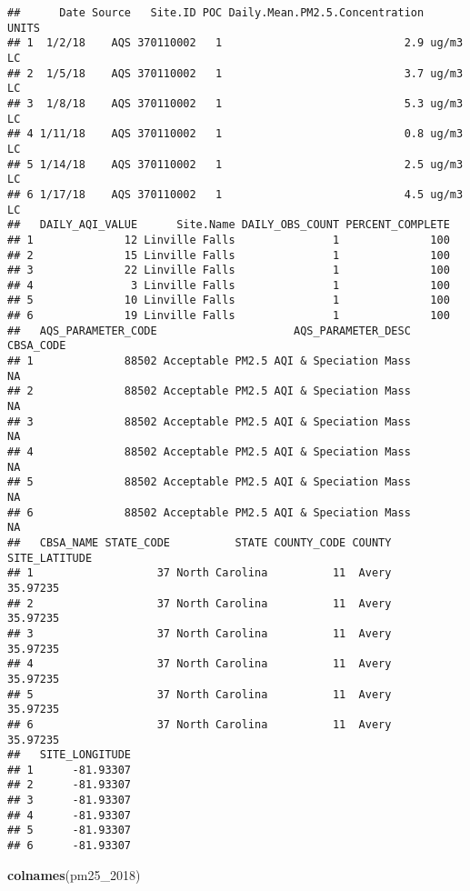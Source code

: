 \documentclass[]{article}
\newenvironment{Shaded}{\begin{snugshade}}{\end{snugshade}}
\newcommand{\KeywordTok}[1]{\textcolor[rgb]{0.13,0.29,0.53}{\textbf{#1}}}
\newcommand{\DecValTok}[1]{\textcolor[rgb]{0.00,0.00,0.81}{#1}}
\newcommand{\NormalTok}[1]{#1}
\begin{document}
\begin{verbatim}
##      Date Source   Site.ID POC Daily.Mean.PM2.5.Concentration    UNITS
## 1  1/2/18    AQS 370110002   1                            2.9 ug/m3 LC
## 2  1/5/18    AQS 370110002   1                            3.7 ug/m3 LC
## 3  1/8/18    AQS 370110002   1                            5.3 ug/m3 LC
## 4 1/11/18    AQS 370110002   1                            0.8 ug/m3 LC
## 5 1/14/18    AQS 370110002   1                            2.5 ug/m3 LC
## 6 1/17/18    AQS 370110002   1                            4.5 ug/m3 LC
##   DAILY_AQI_VALUE      Site.Name DAILY_OBS_COUNT PERCENT_COMPLETE
## 1              12 Linville Falls               1              100
## 2              15 Linville Falls               1              100
## 3              22 Linville Falls               1              100
## 4               3 Linville Falls               1              100
## 5              10 Linville Falls               1              100
## 6              19 Linville Falls               1              100
##   AQS_PARAMETER_CODE                     AQS_PARAMETER_DESC CBSA_CODE
## 1              88502 Acceptable PM2.5 AQI & Speciation Mass        NA
## 2              88502 Acceptable PM2.5 AQI & Speciation Mass        NA
## 3              88502 Acceptable PM2.5 AQI & Speciation Mass        NA
## 4              88502 Acceptable PM2.5 AQI & Speciation Mass        NA
## 5              88502 Acceptable PM2.5 AQI & Speciation Mass        NA
## 6              88502 Acceptable PM2.5 AQI & Speciation Mass        NA
##   CBSA_NAME STATE_CODE          STATE COUNTY_CODE COUNTY SITE_LATITUDE
## 1                   37 North Carolina          11  Avery      35.97235
## 2                   37 North Carolina          11  Avery      35.97235
## 3                   37 North Carolina          11  Avery      35.97235
## 4                   37 North Carolina          11  Avery      35.97235
## 5                   37 North Carolina          11  Avery      35.97235
## 6                   37 North Carolina          11  Avery      35.97235
##   SITE_LONGITUDE
## 1      -81.93307
## 2      -81.93307
## 3      -81.93307
## 4      -81.93307
## 5      -81.93307
## 6      -81.93307
\end{verbatim}

\begin{Shaded}
\begin{Highlighting}[]
\KeywordTok{colnames}\NormalTok{(pm25_}\DecValTok{2018}\NormalTok{)}
\end{Highlighting}
\end{Shaded}
\end{document}
